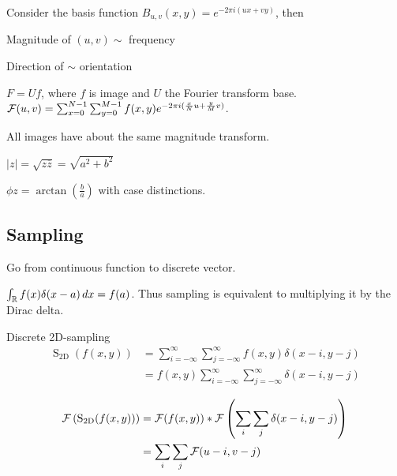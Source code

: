 Consider the basis function \(B_{u,v}(x, y) = e^{-2\pi i(ux + vy)}\), then

\begin{itemize*}
  \item Magnitude of \((u, v) \sim\) frequency
  \item Direction of \(\sim\) orientation
\end{itemize*}

\begin{definition}[FT on Images]
 \(F = Uf\), where \(f\) is image and \(U\) the Fourier transform base.
 \(\operatorname{\mathcal{F}}(u,v) = \sum_{x = 0}^{N - 1}\sum_{y = 0}^{M - 1} f(x, y) e^{-2\pi i (\frac{x}{N}u + \frac{y}{M}v)}\).
\end{definition}

\begin{theorem}
  All images have about the same magnitude transform.
\end{theorem}

\begin{definition}[Magnitude of \(z \in \C\)]
  \(|z| = \sqrt{z \overline{z}} = \sqrt{a^2 + b^2}\)
\end{definition}

\begin{definition}[Phase of \(z \in \C\)]
  \(\phi{z} = \arctan(\frac{b}{a})\) with case distinctions.
\end{definition}

\subsection{Sampling}
Go from continuous function to discrete vector.

\begin{definition}
  \(\int_{\operatorname{\mathbb{R}}}f(x)\delta(x - a) \,dx = f(a)\). Thus sampling is equivalent to multiplying it by the Dirac delta.
\end{definition}

\begin{definition}
  Discrete 2D-sampling
  \[\begin{aligned} \operatorname{S}_{2 \mathrm{D}}(f(x, y)) & =\sum_{i=-\infty}^{\infty} \sum_{j=-\infty}^{\infty} f(x, y) \delta(x-i, y-j) \\ & =f(x, y) \sum_{i=-\infty}^{\infty} \sum_{j=-\infty}^{\infty} \delta(x-i, y-j)\end{aligned}\]
\end{definition}

\begin{definition}
  \begin{align*}
    \operatorname{\mathcal{F}}\left(\operatorname{S}_{2 \mathrm{D}}(f(x, y))\right) & = \operatorname{\mathcal{F}}(f(x, y)) \ast \operatorname{\mathcal{F}}\left(\sum_{i} \sum_{j} \delta(x-i, y-j)\right) \\
    & = \sum_i \sum_j \operatorname{\mathcal{F}}(u - i, v - j)
  \end{align*}
\end{definition}

